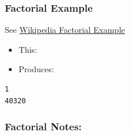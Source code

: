 \subsubsection{Factorial Example}\label{factorial-example}

See
\href{http://en.wikipedia.org/wiki/Template_metaprogramming}{Wikipedia
Factorial Example}

\begin{itemize}
\itemsep1pt\parskip0pt
\item
  This:
\end{itemize}

\begin{Shaded}
\begin{Highlighting}[]
  

 \NormalTok{<} 
 
     
\NormalTok{\};}

 \NormalTok{<>}
 \NormalTok{> \{}
      \NormalTok{\};}
\NormalTok{\};}

 
\NormalTok{\}}
\end{Highlighting}
\end{Shaded}

\begin{itemize}
\itemsep1pt\parskip0pt
\item
  Produces:
\end{itemize}

\begin{verbatim}
1
40320
\end{verbatim}

\subsubsection{Factorial Notes:}\label{factorial-notes}

